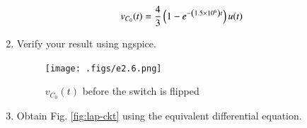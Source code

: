 \documentclass[journal,12pt,twocolumn]{IEEEtran}
\renewcommand\thesection{\arabic{section}}
\begin{document}
\begin{enumerate}[label=\arabic*.,ref=\thesection.\theenumi]
\begin{align}
	&v_{C_0}(t) = \frac{4}{3}\left(1 - e^{-\left(1.5 \times 10^6\right)t}\right)u(t)
\end{align}
\item Verify your result using ngspice.\\
\solution
\begin{figure}[!htb]
\texttt{[image: .figs/e2.6.png]}
\caption{$v_{C_0}(t)$ before the switch is flipped}
\label{fig:v1-t}
\end{figure}
\vspace{3cm}
\item Obtain Fig. 
\ref{fig:lap-ckt}
using the equivalent differential equation.
\end{enumerate}
\end{document}
